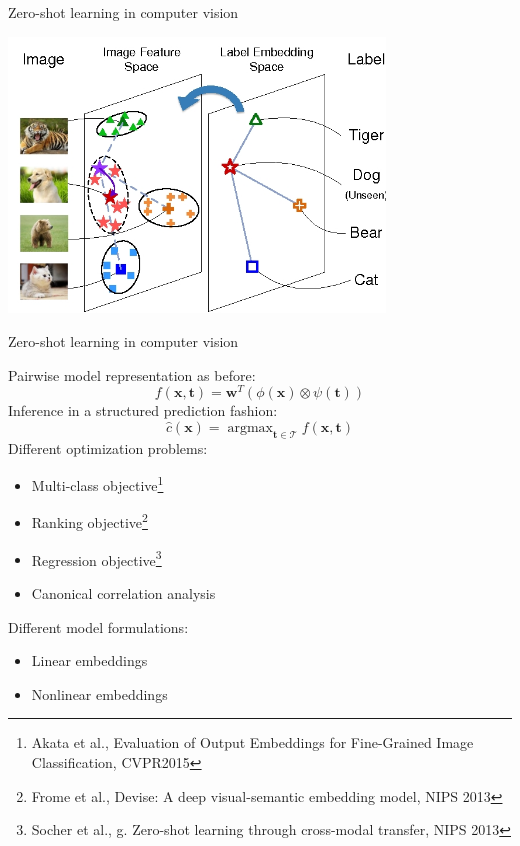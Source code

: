 \documentclass[]{beamer}
\renewcommand{\vec}[1]{\boldsymbol{#1}}
\DeclareMathOperator*{\argmax}{\arg \max}
\begin{document}
\begin{frame}{Zero-shot learning in computer vision}

\begin{center}
\includegraphics[width=0.75\textwidth]{Figures/zero-shot}
\end{center}

\end{frame}

\begin{frame}{Zero-shot learning in computer vision}

\vspace{0.5cm}
Pairwise model representation as before: 
\begin{equation*}
\label{eq:pairwise}
f(\vec{x},\vec{t}) = \vec{w}^T \left(\phi(\vec{x}) \otimes \psi(\vec{t}) \right) 
\end{equation*}
Inference in a structured prediction fashion: 
$$\hat{c}(\vec{x}) = \argmax_{\vec{t} \in \mathcal{T}} f(\vec{x},\vec{t})$$
Different optimization problems: 
\begin{itemize}
\item Multi-class objective\footnote{Akata et al., Evaluation of Output Embeddings for Fine-Grained Image Classification, CVPR2015}
\item Ranking objective\footnote{Frome et al., Devise: A deep visual-semantic embedding
model, NIPS 2013}
\item Regression objective\footnote{Socher et al., g. Zero-shot learning through cross-modal transfer, NIPS 2013}
\item Canonical correlation analysis
\end{itemize}
Different model formulations: 
\begin{itemize}
\item Linear embeddings
\item Nonlinear embeddings
\end{itemize}
\vspace{0.3cm}
\end{frame}
\end{document}
